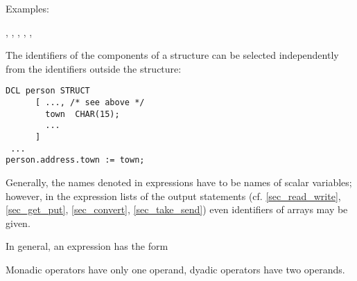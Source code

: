 \begin{grammarframe}
\end{grammarframe}

Examples:

, , , , , 

The identifiers of the components of a structure can be selected
independently from the identifiers outside the structure:

\begin{lstlisting}
DCL person STRUCT
      [ ..., /* see above */ 
        town  CHAR(15);
        ...
      ]
 ...
person.address.town := town;
\end{lstlisting}

Generally, the names denoted in expressions have to be names of scalar
variables; however, in the expression lists of the output statements
(cf. \ref{sec_read_write}, \ref{sec_get_put}, \ref{sec_convert}, 
\ref{sec_take_send}) even identifiers of arrays may be given.

In general, an expression has the form

\begin{grammarframe}
\end{grammarframe}

Monadic operators have only one operand, dyadic operators have two
operands.

\begin{grammarframe}


\end{grammarframe}


